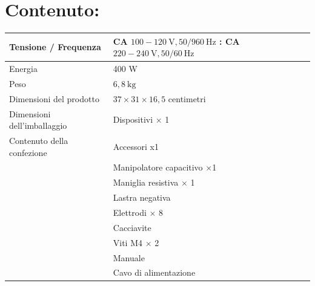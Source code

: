 \documentclass[a4paper]{article}
\begin{document}
\section{Contenuto:}
\begin{center}
\begin{tabular}{|l|l|}
\hline
Tensione / Frequenza & CA $100-120 \mathrm{~V}, 50 / 960 \mathrm{~Hz}$ : CA $220-240 \mathrm{~V}, 50 / 60 \mathrm{~Hz}$ \\
\hline
Energia & 400 W \\
\hline
Peso & $6,8 \mathrm{~kg}$ \\
\hline
Dimensioni del prodotto & $37 \times 31 \times 16,5$ centimetri \\
\hline
Dimensioni dell'imballaggio & Dispositivi $\times$ 1 \\
\hline
Contenuto della confezione & Accessori x1 \\
\hline
 & Manipolatore capacitivo $\times$1 \\
\hline
 & Maniglia resistiva $\times$ 1 \\
\hline
 & Lastra negativa \\
\hline
 & Elettrodi $\times$ 8 \\
\hline
 & Cacciavite \\
\hline
 & Viti M4 $\times$ 2 \\
\hline
 & Manuale \\
\hline
 & Cavo di alimentazione \\
\hline
\end{tabular}
\end{center}




\end{document}
